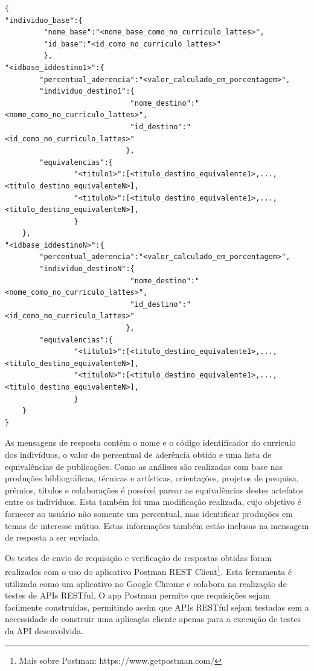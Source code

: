 \begin{lstlisting}[caption={Formato de mensagem de resposta (1:N).},label={lst:msgresposta1N}]
{
"individuo_base":{
         "nome_base":"<nome_base_como_no_curriculo_lattes>",
         "id_base":"<id_como_no_curriculo_lattes>"
         },
"<idbase_iddestino1>":{
		"percentual_aderencia":"<valor_calculado_em_porcentagem>",
		"individuo_destino1":{
						     "nome_destino":"<nome_como_no_curriculo_lattes>",
						     "id_destino":"<id_como_no_curriculo_lattes>"
				            },
		"equivalencias":{
				"<titulo1>":[<titulo_destino_equivalente1>,...,<titulo_destino_equivalenteN>],
				"<tituloN>":[<titulo_destino_equivalente1>,...,<titulo_destino_equivalenteN>],
				}
	},
"<idbase_iddestinoN>":{
		"percentual_aderencia":"<valor_calculado_em_porcentagem>",
		"individuo_destinoN":{
						     "nome_destino":"<nome_como_no_curriculo_lattes>",
						     "id_destino":"<id_como_no_curriculo_lattes>"
				            },
		"equivalencias":{
				"<titulo1>":[<titulo_destino_equivalente1>,...,<titulo_destino_equivalenteN>],
				"<tituloN>":[<titulo_destino_equivalente1>,...,<titulo_destino_equivalenteN>],
				}
	}
}
\end{lstlisting}

As mensagens de resposta contém o nome e o código identificador do currículo dos indivíduos, o valor do percentual de aderência obtido e uma lista de equivalências de publicações. Como as análises são realizadas com base nas produções bibliográficas, técnicas e artísticas, orientações, projetos de pesquisa, prêmios, títulos e colaborações é possível parear as equivalências destes artefatos entre os indivíduos. Esta também foi uma modificação realizada, cujo objetivo é fornecer ao usuário não somente um percentual, mas identificar produções em temas de interesse mútuo. Estas informações também estão inclusas na mensagem de resposta a ser enviada.

Os testes de envio de requisição e verificação de respostas obtidas foram realizados com o uso do aplicativo Postman REST Client\footnote{Mais sobre Postman: https://www.getpostman.com/}. Esta ferramenta é utilizada como um aplicativo no Google Chrome e colabora na realização de testes de APIs RESTful. O app Postman permite que requisições sejam facilmente construídas, permitindo assim que APIs RESTful sejam testadas sem a necessidade de construir uma aplicação cliente apenas para a execução de testes da API desenvolvida.

